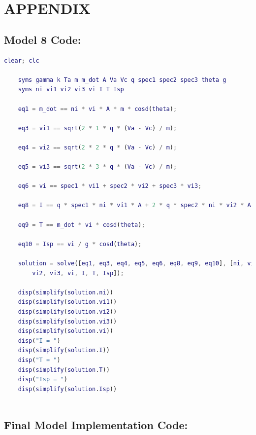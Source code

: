 \documentclass[letterpaper, 10 pt, conference]{ieeeconf}  %
\begin{document}
\clearpage
\section*{APPENDIX}

\subsection{Model 8 Code:}

\begin{lstlisting}[language=Matlab]
    clear; clc
    
    syms gamma k Ta m m_dot A Va Vc q spec1 spec2 spec3 theta g
    syms ni vi1 vi2 vi3 vi I T Isp
    
    eq1 = m_dot == ni * vi * A * m * cosd(theta);
    
    eq3 = vi1 == sqrt(2 * 1 * q * (Va - Vc) / m);
    
    eq4 = vi2 == sqrt(2 * 2 * q * (Va - Vc) / m);
    
    eq5 = vi3 == sqrt(2 * 3 * q * (Va - Vc) / m);
    
    eq6 = vi == spec1 * vi1 + spec2 * vi2 + spec3 * vi3;
    
    eq8 = I == q * spec1 * ni * vi1 * A + 2 * q * spec2 * ni * vi2 * A + 3 * q * spec3 * ni * vi3 * A;
    
    eq9 = T == m_dot * vi * cosd(theta);
    
    eq10 = Isp == vi / g * cosd(theta);
    
    solution = solve([eq1, eq3, eq4, eq5, eq6, eq8, eq9, eq10], [ni, vi1, ...
        vi2, vi3, vi, I, T, Isp]);
    
    disp(simplify(solution.ni))
    disp(simplify(solution.vi1))
    disp(simplify(solution.vi2))
    disp(simplify(solution.vi3))
    disp(simplify(solution.vi))
    disp("I = ")
    disp(simplify(solution.I))
    disp("T = ")
    disp(simplify(solution.T))
    disp("Isp = ")
    disp(simplify(solution.Isp))
    
\end{lstlisting}

\subsection{Final Model Implementation Code:}
\end{document}
